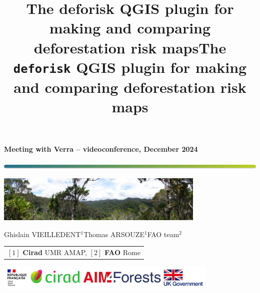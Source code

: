 \documentclass[10pt,table,dvipsnames,compress]{beamer}
\date{}
\title{The deforisk QGIS plugin for making and comparing deforestation risk maps}
\title[deforisk QGIS plugin]{The \texttt{deforisk} QGIS plugin for making and comparing deforestation risk maps}
\begin{document}

{
  \begin{frame}
  \begin{center}
  \small{\textbf{Meeting with Verra -- videoconference, December 2024}}
  \end{center}
  \vspace{-0.5cm}
  \titlepage %
  \vspace{-3cm}
  \begin{center}
    \includegraphics[width=\textwidth]{figs/Barre_couleur}
    
    \vspace{0.25cm}
    
    \includegraphics[width=10cm]{figs/Banniere}
    
    \small{Ghislain VIEILLEDENT$^{1}$\hspace{0.25cm}Thomas ARSOUZE$^{1}$\hspace{0.25cm}FAO team$^{2}$}
      
    \vspace{0.25cm}
    
    {\scriptsize
      \begin{tabular}{l}
        $[1]$ \textbf{Cirad} UMR AMAP, $[2]$ \textbf{FAO} Rome
      \end{tabular}
    }
    
    \includegraphics[width=0.8\textwidth]{figs/partners_logos}
    
  \end{center}
  \end{frame}
}
\end{document}

